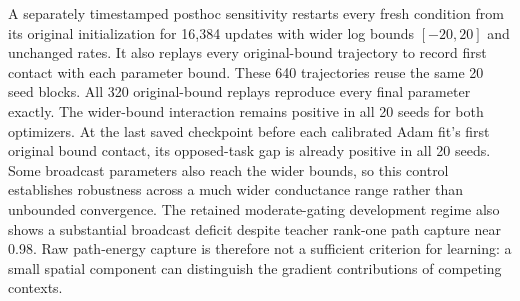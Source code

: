 A separately timestamped posthoc sensitivity restarts every fresh condition from its original initialization for 16,384 updates with wider log bounds $[-20,20]$ and unchanged rates. It also replays every original-bound trajectory to record first contact with each parameter bound. These 640 trajectories reuse the same 20 seed blocks. All 320 original-bound replays reproduce every final parameter exactly. The wider-bound interaction remains positive in all 20 seeds for both optimizers. At the last saved checkpoint before each calibrated Adam fit's first original bound contact, its opposed-task gap is already positive in all 20 seeds. Some broadcast parameters also reach the wider bounds, so this control establishes robustness across a much wider conductance range rather than unbounded convergence. The retained moderate-gating development regime also shows a substantial broadcast deficit despite teacher rank-one path capture near 0.98. Raw path-energy capture is therefore not a sufficient criterion for learning: a small spatial component can distinguish the gradient contributions of competing contexts.

